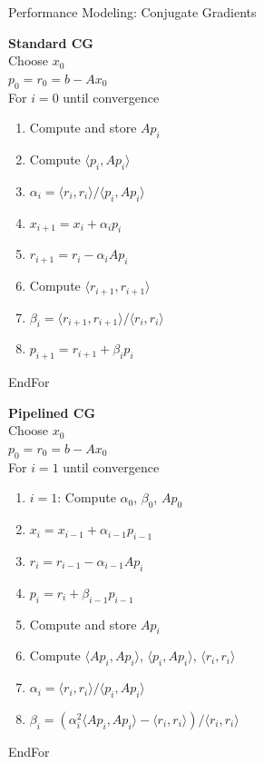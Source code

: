 \begin{frame}[fragile]{Performance Modeling: Conjugate Gradients}

 \begin{block}{}
  
   \begin{minipage}{0.45\textwidth}
      {\large \textbf{Standard CG}} \\
      
      Choose $x_0$ \\
      $p_0 = r_0 = b - Ax_0$ \\
      For $i=0$ until convergence
     \begin{enumerate}
      \item Compute and store $Ap_i$
      \item Compute $\langle p_i, Ap_i \rangle$
      \item $\alpha_i = \langle r_i, r_i \rangle / \langle p_i, Ap_i \rangle$
      \item $x_{i+1} = x_{i} + \alpha_i p_i$          
      \item $r_{i+1} = r_i - \alpha_i Ap_i$       
      \item Compute $\langle r_{i+1}, r_{i+1} \rangle$
      \item $\beta_i = \langle r_{i+1}, r_{i+1} \rangle / \langle r_i, r_i \rangle$
      \item $p_{i+1} = r_{i+1} + \beta_i p_i$
     \end{enumerate}
     EndFor
   \end{minipage}
   \begin{minipage}{0.53\textwidth}
      {\large \textbf{Pipelined CG}} \\
      
      Choose $x_0$ \\
      $p_0 = r_0 = b - Ax_0$ \\
      For $i=1$ until convergence
     \begin{enumerate}
      \item $i=1$: Compute $\alpha_0$, $\beta_0$, $Ap_0$
      \item {\color{blue}$x_i = x_{i-1} + \alpha_{i-1} p_{i-1}$}
      \item {\color{blue}$r_i = r_{i-1} - \alpha_{i-1} Ap_i$}
      \item {\color{blue}$p_i = r_i + \beta_{i-1} p_{i-1}$}       
      \item {\color{red} Compute and store $Ap_i$}
      \item  {\color{red} Compute $\langle Ap_i, Ap_i \rangle$, $\langle p_i, Ap_i \rangle$}, {\color{blue}$\langle r_i, r_i \rangle$}
      \item $\alpha_i = \langle r_i, r_i \rangle / \langle p_i, Ap_i \rangle$
      \item $\beta_i = ( \alpha_i^2 \langle Ap_i, Ap_i \rangle - \langle r_i, r_i \rangle) / \langle r_i, r_i \rangle$
     \end{enumerate}
     EndFor
   \end{minipage}
   
   \end{block}
   
\end{frame}


